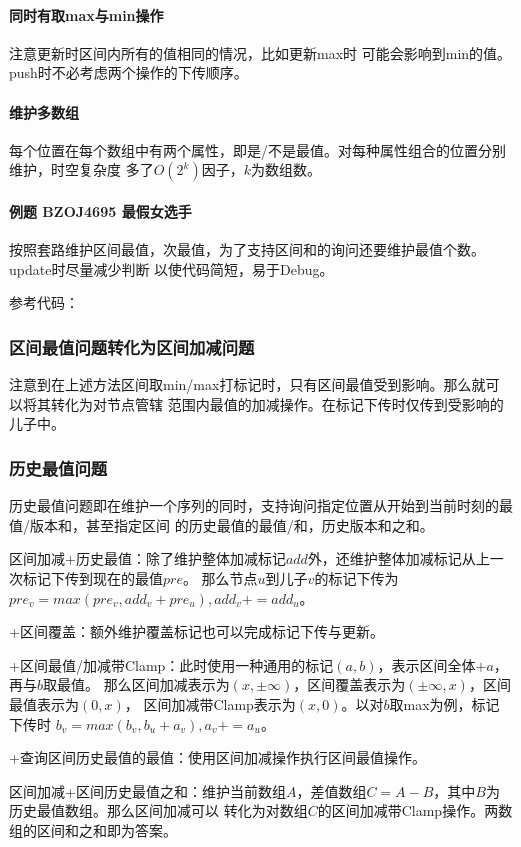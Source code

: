 \paragraph{同时有取max与min操作}注意更新时区间内所有的值相同的情况，比如更新max时
可能会影响到min的值。push时不必考虑两个操作的下传顺序。

\paragraph{维护多数组}
每个位置在每个数组中有两个属性，即是/不是最值。对每种属性组合的位置分别维护，时空复杂度
多了$O(2^k)$因子，$k$为数组数。

\paragraph{例题 BZOJ4695 最假女选手}
按照套路维护区间最值，次最值，为了支持区间和的询问还要维护最值个数。update时尽量减少判断
以使代码简短，易于Debug。

参考代码：


\subsubsection{区间最值问题转化为区间加减问题}
注意到在上述方法区间取min/max打标记时，只有区间最值受到影响。那么就可以将其转化为对节点管辖
范围内最值的加减操作。在标记下传时仅传到受影响的儿子中。
\subsubsection{历史最值问题}
历史最值问题即在维护一个序列的同时，支持询问指定位置从开始到当前时刻的最值/版本和，甚至指定区间
的历史最值的最值/和，历史版本和之和。

区间加减+历史最值：除了维护整体加减标记$add$外，还维护整体加减标记从上一次标记下传到现在的最值$pre$。
那么节点$u$到儿子$v$的标记下传为$pre_v=max(pre_v,add_v+pre_u),add_v+=add_u$。

+区间覆盖：额外维护覆盖标记也可以完成标记下传与更新。

+区间最值/加减带Clamp：此时使用一种通用的标记$(a,b)$，表示区间全体$+a$，再与$b$取最值。
那么区间加减表示为$(x,\pm\infty)$，区间覆盖表示为$(\pm\infty,x)$，区间最值表示为$(0,x)$，
区间加减带Clamp表示为$(x,0)$。以对$b$取max为例，标记下传时
$b_v=max(b_v,b_u+a_v),a_v+=a_u$。

+查询区间历史最值的最值：使用区间加减操作执行区间最值操作。

区间加减+区间历史最值之和：维护当前数组$A$，差值数组$C=A-B$，其中$B$为历史最值数组。那么区间加减可以
转化为对数组$C$的区间加减带Clamp操作。两数组的区间和之和即为答案。

